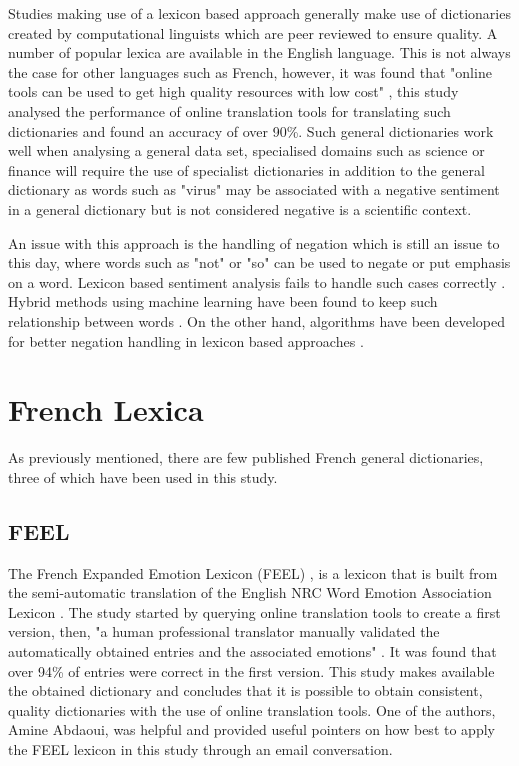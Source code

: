 Studies making use of a lexicon based approach generally make use of dictionaries created by computational linguists which are peer reviewed to ensure quality. A number of popular lexica are available in the English language. This is not always the case for other languages such as French, however, it was found that "online tools can be used to get high quality resources with low cost" \citep{abdaoui2017feel}, this study analysed the performance of online translation tools for translating such dictionaries and found an accuracy of over 90\%. Such general dictionaries work well when analysing a general data set, specialised domains such as science or finance will require the use of specialist dictionaries in addition to the general dictionary as words such as "virus" may be associated with a negative sentiment in a general dictionary but is not considered negative is a scientific context.

An issue with this approach is the handling of negation which is still an issue to this day, where words such as "not" or "so" can be used to negate or put emphasis on a word. Lexicon based sentiment analysis fails to handle such cases correctly \citep{le2014distributed}. Hybrid methods using machine learning have been found to keep such relationship between words \citep{mikolov2013exploiting}. On the other hand, algorithms have been developed for better negation handling in lexicon based approaches \citep{diamantini2016negation}.


\section{French Lexica}\label{French Lexicons}

As previously mentioned, there are few published French general dictionaries, three of which have been used in this study.

\subsection{FEEL}\label{chap: feel}

The French Expanded Emotion Lexicon (FEEL) \citep{abdaoui2017feel}, is a lexicon that is built from the semi-automatic translation of the English NRC Word Emotion Association Lexicon \citep{mohammad2013crowdsourcing}. The study started by querying online translation tools to create a first version, then, "a human professional translator manually validated the automatically obtained entries and the associated emotions" \citep{abdaoui2017feel}. It was found that over 94\% of entries were correct in the first version. This study makes available the obtained dictionary and concludes that it is possible to obtain consistent, quality dictionaries with the use of online translation tools. One of the authors, Amine Abdaoui, was helpful and provided useful pointers on how best to apply the FEEL lexicon in this study through an email conversation.

